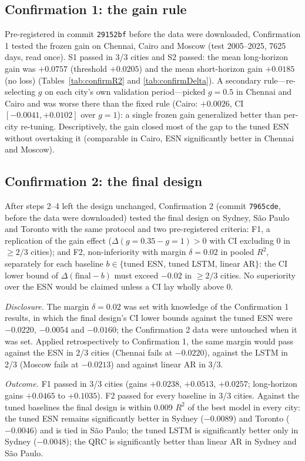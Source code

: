 \documentclass[aps,prresearch,preprint,superscriptaddress,amsmath,amssymb,floatfix]{revtex4-2}
\begin{document}
\subsection{Confirmation 1: the gain rule}
Pre-registered in commit \texttt{29152bf} before the data were downloaded, Confirmation
1 tested the frozen gain on Chennai, Cairo and Moscow (test 2005--2025, 7625 days, read
once). S1 passed in 3/3 cities and S2 passed: the mean long-horizon gain was $+0.0757$
(threshold $+0.0205$) and the mean short-horizon gain $+0.0185$ (no loss)
(Tables~\ref{tab:confirmR2} and \ref{tab:confirmDelta}). A secondary rule---re-selecting
$g$ on each city's own validation period---picked $g=0.5$ in Chennai and Cairo and was
worse there than the fixed rule (Cairo: $+0.0026$, CI $[-0.0041,+0.0102]$ over $g=1$): a
single frozen gain generalized better than per-city re-tuning. Descriptively, the gain
closed most of the gap to the tuned ESN without overtaking it (comparable in Cairo,
ESN significantly better in Chennai and Moscow).

\subsection{Confirmation 2: the final design}
After steps 2--4 left the design unchanged, Confirmation 2 (commit \texttt{7965cde},
before the data were downloaded) tested the final design on Sydney, S\~{a}o Paulo and
Toronto with the same protocol and two pre-registered criteria: F1, a replication of
the gain effect ($\Delta(g{=}0.35-g{=}1)>0$ with CI excluding 0 in $\ge2/3$ cities); and
F2, non-inferiority with margin $\delta=0.02$ in pooled $R^2$, separately for each
baseline $b\in\{$tuned ESN, tuned LSTM, linear AR$\}$: the CI lower bound of
$\Delta(\mathrm{final}-b)$ must exceed $-0.02$ in $\ge2/3$ cities. No superiority over
the ESN would be claimed unless a CI lay wholly above 0.

\emph{Disclosure.} The margin $\delta=0.02$ was set with knowledge of the Confirmation 1
results, in which the final design's CI lower bounds against the tuned ESN were
$-0.0220$, $-0.0054$ and $-0.0160$; the Confirmation 2 data were untouched when it was
set. Applied retrospectively to Confirmation 1, the same margin would pass against the
ESN in 2/3 cities (Chennai fails at $-0.0220$), against the LSTM in 2/3 (Moscow fails
at $-0.0213$) and against linear AR in 3/3.

\emph{Outcome.} F1 passed in 3/3 cities (gains $+0.0238$, $+0.0513$, $+0.0257$; long-horizon
gains $+0.0465$ to $+0.1035$). F2 passed for every baseline in 3/3 cities. Against the
tuned baselines the final design is within 0.009 $R^2$ of the best model in every city:
the tuned ESN remains significantly better in Sydney ($-0.0089$) and Toronto
($-0.0046$) and is tied in S\~{a}o Paulo; the tuned LSTM is significantly better only in
Sydney ($-0.0048$); the QRC is significantly better than linear AR in Sydney and S\~{a}o
Paulo.
\end{document}
